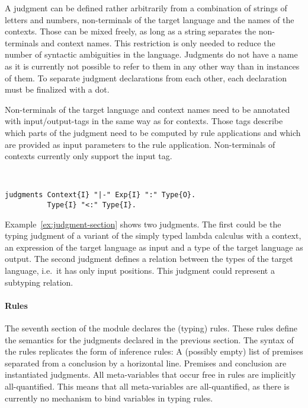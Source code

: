 A judgment can be defined rather arbitrarily from a combination of
strings of letters and numbers, non-terminals of the target language
and the names of the contexts. Those can be mixed freely, as long as a
string separates the non-terminals and context names. This restriction
is only needed to reduce the number of syntactic ambiguities in the
language. Judgments do not have a name as it is currently not possible
to refer to them in any other way than in instances of them. To
separate judgment declarations from each other, each declaration must
be finalized with a dot.

Non-terminals of the target language and context names need to be
annotated with input/output-tags in the same way as for
contexts. Those tags describe which parts of the judgment need to be
computed by rule applications and which are provided as input
parameters to the rule application. Non-terminals of contexts
currently only support the input tag.

\begin{example}{~}
\begin{lstlisting}[language=sltc]
judgments Context{I} "|-" Exp{I} ":" Type{O}.
          Type{I} "<:" Type{I}.
\end{lstlisting}
\label{ex:judgment-section}
\end{example}

Example~\ref{ex:judgment-section} shows two judgments. The first could
be the typing judgment of a variant of the simply typed lambda
calculus with a context, an expression of the target language as input
and a type of the target language as output. The second judgment
defines a relation between the types of the target language, i.e.\ it
has only input positions. This judgment could represent a subtyping
relation.

\paragraph{Rules} The seventh section of the module declares the
(typing) rules. These rules define the semantics for the judgments
declared in the previous section. The syntax of the rules replicates
the form of inference rules: A (possibly empty) list of premises
separated from a conclusion by a horizontal line. Premises and
conclusion are instantiated judgments. All meta-variables that occur
free in rules are implicitly all-quantified. This means that all
meta-variables are all-quantified, as there is currently no mechanism
to bind variables in typing rules.

